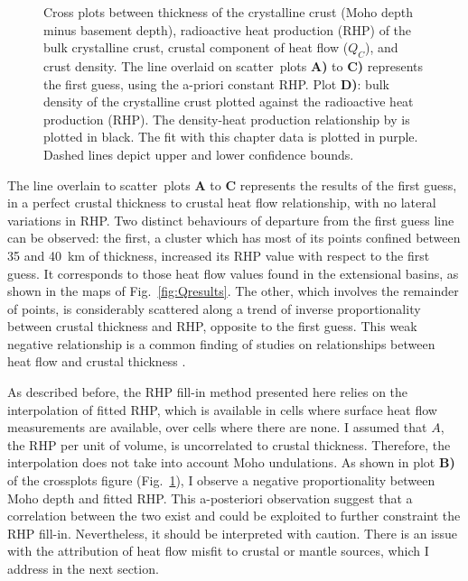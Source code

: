 \begin{figure}
	\begin{adjustbox}{center}
	\end{adjustbox}
	\caption[Cross plots between thickness of the crystalline crust, RHP of the bulk crystalline crust, crustal component of heat flow, and crust density.]{Cross plots between thickness of the crystalline crust (Moho depth minus basement depth), radioactive heat production (RHP) of the bulk crystalline crust, crustal component of heat flow ($Q_C$), and crust density. The line overlaid on scatter~plots \textbf{A)} to \textbf{C)} represents the first guess, using the a-priori constant RHP.
	Plot \textbf{D)}: bulk density of the crystalline crust plotted against the radioactive heat production (RHP). The density-heat production relationship by \textcite{Hasterok2017_ign} is plotted in black. The fit with this chapter data is plotted in purple. Dashed lines depict upper and lower confidence bounds.}
	\label{fig:Qcrossplots}
\end{figure}

The line overlain to scatter~plots \textbf{A} to \textbf{C} represents the results of the first guess, in a perfect crustal thickness to crustal heat flow relationship, with no lateral variations in RHP.
Two distinct behaviours of departure from the first guess line can be observed: the first, a cluster which has most of its points confined between 35 and 40~\si{\kilo \metre} of thickness, increased its RHP value with respect to the first guess.
It corresponds to those heat flow values found in the extensional basins, as shown in the maps of Fig.~\ref{fig:Qresults}.
The other, which involves the remainder of points, is considerably scattered along a trend of inverse proportionality between crustal thickness and RHP, opposite to the first guess.
This weak negative relationship is a common finding of studies on relationships between heat flow and crustal thickness \parencites{Cermak1993}{Mareschal2013}.

As described before, the RHP fill-in method presented here relies on the interpolation of fitted RHP, which is available in cells where surface heat flow measurements are available, over cells where there are none.
I assumed that $A$, the RHP per unit of volume, is uncorrelated to crustal thickness.
Therefore, the interpolation does not take into account Moho undulations.
As shown in plot \textbf{B)} of the crossplots figure (Fig.~\ref{fig:Qcrossplots}), I observe a negative proportionality between Moho depth and fitted RHP.
This a-posteriori observation suggest that a correlation between the two exist and could be exploited to further constraint the RHP fill-in.
Nevertheless, it should be interpreted with caution.
There is an issue with the attribution of heat flow misfit to crustal or mantle sources, which I address in the next section.

